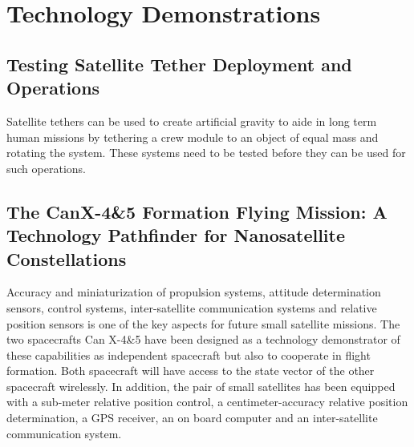 \section{Technology Demonstrations}

\subsection{Testing Satellite Tether Deployment and Operations}

Satellite tethers can be used to create artificial gravity to aide in long term human missions by tethering a crew module to an object of equal mass and rotating the system. These systems need to be tested before they can be used for such operations. \cite{Ref:Carlson}\cite{Ref:Mazzoleni}

\subsection{The CanX-4\&5 Formation Flying Mission: A Technology Pathfinder for Nanosatellite Constellations}

Accuracy and miniaturization of propulsion systems, attitude determination
sensors, control systems, inter-satellite communication systems and
relative position sensors is one of the key aspects for future small
satellite missions. The two spacecrafts Can X-4\&5 have been designed
as a technology demonstrator of these capabilities as independent
spacecraft but also to cooperate in flight formation. Both spacecraft
will have access to the state vector of the other spacecraft wirelessly.
In addition, the pair of small satellites has been equipped with a
sub-meter relative position control, a centimeter-accuracy relative
position determination, a GPS receiver, an on board computer and an
inter-satellite communication system.\cite{Bonin_FF_CanX-4&5}
